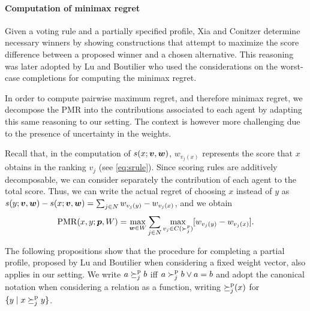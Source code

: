 \documentclass[runningheads]{llncs}
\theoremstyle{remark}
\begin{document}

\paragraph{Computation of minimax regret}
Given a voting rule and a partially specified profile, Xia and Conitzer \cite{Xia2008} determine necessary winners by showing constructions that attempt to maximize the score difference between a proposed winner and a chosen alternative. This reasoning was later adopted by Lu and Boutilier \cite{Lu2011} who used the considerations on the worst-case completions for computing the minimax regret. 

In order to compute pairwise maximum regret, and therefore minimax regret, we decompose the PMR into the contributions associated to each agent by adapting this same reasoning to our setting. The context is however more challenging due to the presence of uncertainty in the weights.

Recall that, in the computation of $s(x; \bm{v}, \bm{w})$, $w_{v_j(x)}$ represents the score that $x$ obtains in the ranking $v_j$ (see \cref{eq:srule}).
Since scoring rules are additively decomposable, we can consider separately the contribution of each agent to the total score. Thus, we can write the actual regret of choosing $x$ instead of $y$ as $s(y; \bm{v},\bm{w}) - s(x; \bm{v}, \bm{w}) = \sum_{j \in N} w_{v_j(y)} - w_{v_j(x)}$, and we obtain \[\operatorname{PMR}(x,y; {\bm{p}}, W) =  \max_{\bm{w} \in W} \sum_{j \in N} \max_{v_j \in C(\succ_j^p)} [w_{v_j(y)} - w_{v_j(x)}].\]

The following propositions show that the procedure for completing a partial profile,  proposed by Lu and Boutilier \cite{Lu2011} when considering a fixed weight vector, also applies in our setting. We write $a \succeq^\text{p}_j b$ iff $a \succ^\text{p}_j b \lor a = b$ and adopt the canonical notation when considering a relation as a function, writing ${\succeq^\text{p}_j}(x)$ for $\set{y \suchthat x \pprefeq_j y}$.
\end{document}
